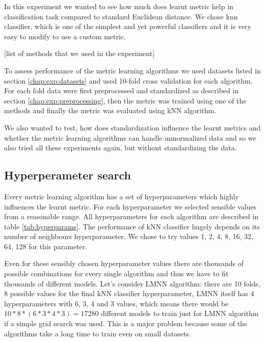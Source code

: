 \documentclass[12pt,a4paper]{report}
\begin{document}
In this experiment we wanted to see how much does learnt metric help in classification task compared to standard Euclidean distance. We chose \ac{knn} classifier, which is one of the simplest and yet powerful classifiers and it is very easy to modify to use a custom metric.

[list of methods that we used in the experiment] %

To assess performance of the metric learning algorithms we used datasets listed in section \ref{chap:exp:datasets} and used 10-fold cross validation for each algorithm. For each fold data were first preprocessed and standardized as described in section \ref{chap:exp:preprocessing}, then the metric was trained using one of the methods and finally the metric was evaluated using kNN algorithm.

We also wanted to test, how does standardization influence the learnt metrics and whether the metric learning algorithms can handle unnormalized data and so we also tried all these experiments again, but without standardizing the data.

\subsection{Hyperperameter search} \label{chap:exp:hypsearch}

Every metric learning algorithm has a set of hyperparameters which highly influences the learnt metric. For each hyperparameter we selected sensible values from a reasonable range. All hyperparameters for each algorithm are described in table \ref{tab:hyperparams}. The performance of kNN classifier hugely depends on its number of neighbours hyperparameter. We chose to try values 1, 2, 4, 8, 16, 32, 64, 128 for this parameter.



Even for these sensibly chosen hyperparameter values there are thousands of possible combinations for every single algorithm and thus we have to fit thousands of different models. Let’s consider LMNN algorithm: there are 10 folds, 8 possible values for the final kNN classifier hyperparameter, LMNN itself has 4 hyperparameters with 6, 3, 4 and 3 values, which means there would be $10*8*(6*3*4*3)=17280$ different models to train just for LMNN algorithm if a simple grid search was used. This is a major problem because some of the algorithms take a long time to train even on small datasets.
\end{document}

